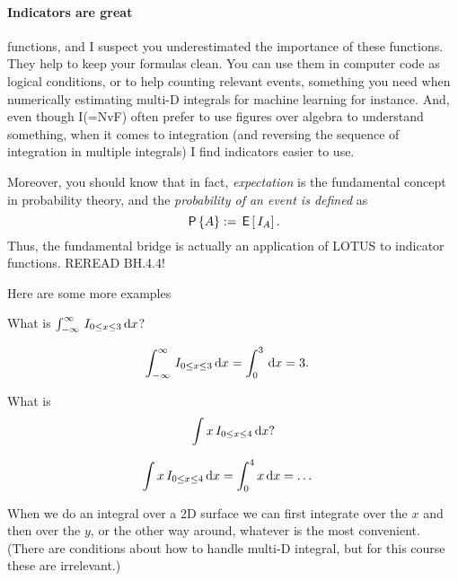 \paragraph{Indicators are great} functions, and I suspect you underestimated the importance of these functions.
They help to keep your formulas clean.
You can use them in computer code as logical conditions, or to help counting relevant events, something you need when numerically estimating multi-D integrals for machine learning for instance.
And, even though I(=NvF) often prefer to use figures over algebra to understand something, when it comes to integration (and reversing the sequence of integration in multiple integrals) I find indicators easier to use.

Moreover, you should know that in fact, \emph{expectation} is the fundamental concept in probability theory, and the \emph{probability of an event is defined} as
\begin{equation}
  \label{eq:4}
  \,\mathsf{P}\left\{A\right\} := \,\mathsf{E}\left[\,I_{A}\right].
\end{equation}
Thus, the fundamental bridge is actually an application of LOTUS to indicator functions. REREAD BH.4.4!


Here are some more examples

\begin{exercise}
What is $\int_{-\infty}^{\infty} \,I_{0\leq x \leq 3} \,\textrm{d}x$?
\clearpage
\begin{solution}
\begin{align*}
\int_{-\infty}^{\infty} \,I_{0\leq x \leq 3} \,\textrm{d}x
&=
\int_{0}^{3}  \,\textrm{d}x  = 3.
\end{align*}
\end{solution}
\end{exercise}

\begin{exercise}
What is
\begin{equation}
\label{eq:5}
\int x \,I_{0\leq x \leq 4} \,\textrm{d}x?
\end{equation}
\begin{solution}
\begin{align*}
\int x \,I_{0\leq x \leq 4} \,\textrm{d}x
&=
\int_{0}^{4} x \,\textrm{d}x = \ldots
\end{align*}
\end{solution}
\end{exercise}

When we do an integral over a 2D surface we can first integrate over the $x$ and then over the $y$, or the other way around, whatever is the most convenient.
(There are conditions about how to handle multi-D integral, but for this course these are irrelevant.)

